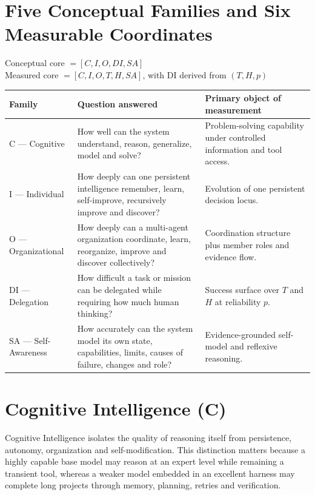 \documentclass[11pt]{article}
\theoremstyle{definition}
\begin{document}
\section{Five Conceptual Families and Six Measurable Coordinates}

\begin{center}
Conceptual core $= [C, I, O, DI, SA]$\\
Measured core $= [C, I, O, T, H, SA]$, with DI derived from $(T, H, p)$
\end{center}

\begin{table}[h]
\centering\small
\begin{tabularx}{\textwidth}{@{}lYY@{}}
\toprule
Family & Question answered & Primary object of measurement \\
\midrule
C --- Cognitive & How well can the system understand, reason, generalize, model and solve? & Problem-solving capability under controlled information and tool access. \\
I --- Individual & How deeply can one persistent intelligence remember, learn, self-improve, recursively improve and discover? & Evolution of one persistent decision locus. \\
O --- Organizational & How deeply can a multi-agent organization coordinate, learn, reorganize, improve and discover collectively? & Coordination structure plus member roles and evidence flow. \\
DI --- Delegation & How difficult a task or mission can be delegated while requiring how much human thinking? & Success surface over $T$ and $H$ at reliability $p$. \\
SA --- Self-Awareness & How accurately can the system model its own state, capabilities, limits, causes of failure, changes and role? & Evidence-grounded self-model and reflexive reasoning. \\
\bottomrule
\end{tabularx}
\end{table}

\section{Cognitive Intelligence (C)}

Cognitive Intelligence isolates the quality of reasoning itself from persistence, autonomy, organization and self-modification. This distinction matters because a highly capable base model may reason at an expert level while remaining a transient tool, whereas a weaker model embedded in an excellent harness may complete long projects through memory, planning, retries and verification.
\end{document}
